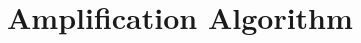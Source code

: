 \documentclass[a4paper,UKenglish,cleveref, autoref]{lipics-v2019}
\begin{document}
%
%
%
%
%
%


\section{Amplification Algorithm}\label{sec:Amplification}
 




\appendix
\end{document}
